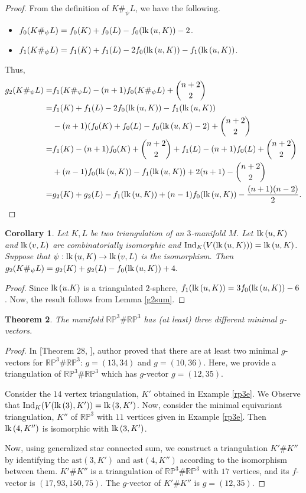 \documentclass[11pt]{amsart}
\numberwithin{equation}{section}
\newtheorem{theorem}{Theorem}[section]
\newtheorem{corollary}[theorem]{Corollary}
\theoremstyle{definition}
\newcommand{\lk}{\mbox{\upshape lk}\,}
\newcommand{\RP}{\mathbb{RP}}
\begin{document}
\begin{proof}
From the definition of $K\#_{\psi}L$, we have the following.
\begin{itemize}
    \item $f_0(K\#_{\psi}L)=f_0(K)+f_0(L)-f_0(\lk(u,K))-2$.
    \item $f_1(K\#_{\psi}L)=f_1(K)+f_1(L)-2f_0(\lk(u,K))-f_1(\lk(u,K))$.
    \end{itemize}

    Thus,
    \begin{align*}
   g_2(K\#_{\psi}L)=&f_1(K\#_{\psi}L)-(n+1)f_0(K\#_{\psi}L)+\binom{n+2}{2}\\
 =& f_1(K)+f_1(L)-2f_0(\lk(u,K))-f_1(\lk(u,K))\\
 &-(n+1)(f_0(K)+f_0(L)-f_0(\lk(u,K)-2)+\binom{n+2}{2}\\
 =& f_1(K)-(n+1)f_0(K)+\binom{n+2}{2} +f_1(L)-(n+1)f_0(L)+\binom{n+2}{2}\\
 &+(n-1)f_0(\lk(u,K))-f_1(\lk(u,K))+2(n+1)- \binom{n+2}{2}\\
 =& g_2(K)+g_2(L)-f_1(\lk(u,K))+(n-1)f_0(\lk(u,K))-\frac{(n+1)(n-2)}{2}.
    \end{align*}
\end{proof}

\begin{corollary}
    Let $K,L$ be two triangulation of an  $3$-manifold $M$. Let $\lk(u,K)$ and $\lk(v,L)$ are combinatorially isomorphic and $\mathrm{Ind}_K(V(\lk(u,K)))=\lk(u,K)$.  Suppose that $\psi: \lk(u,K)\rightarrow \lk(v,L)$ is the isomorphism. Then $g_2(K\#_{\psi}L)=g_2(K)+g_2(L) -f_0(\lk(u,K))+4.$
\end{corollary}

\begin{proof}
    Since  $\lk(u.K)$ is a triangulated $2$-sphere, $f_1(\lk(u,K))=3f_0(\lk(u,K))-6$.
    Now, the result follows from Lemma \ref{g2sum}.
\end{proof}

\begin{theorem}\label{three}
    The manifold $\RP^3\#\RP^3$ has (at least) three different minimal $g$-vectors.
\end{theorem}
\begin{proof}
In [Theorem 28, \cite{LS}], author proved that there are at least two minimal $g$-vectors for $\RP^3\#\RP^3$: $g=(13,34)$ and $g=(10,36)$. Here, we provide a triangulation of $\RP^3\#\RP^3$ which has $g$-vector $g=(12,35)$.

Consider the $14$ vertex triangulation, $K'$ obtained in Example \ref{rp3e}. We Observe that $\mathrm{Ind}_K(V(\lk(3),K'))=\lk(3,K')$. Now, consider the minimal equivariant triangulation, $K''$ of $\RP^3$ with $11$ vertices given in Example \ref{rp3e}. Then  $\lk(4,K'')$ is isomorphic with $\lk(3,K')$. 

Now, using generalized star connected sum, we construct a triangulation $K'\#K''$ by identifying the $\mathrm{ast}(3,K')$ and $\mathrm{ast}(4,K'')$ according to the isomorphism between them.  $K'\#K''$ is a triangulation of $\RP^3\#\RP^3$ with $17$ vertices, and its $f$-vector is $(17,93,150,75)$. The $g$-vector of $K'\#K''$ is $g=(12,35)$.
\end{proof}
\end{document}
